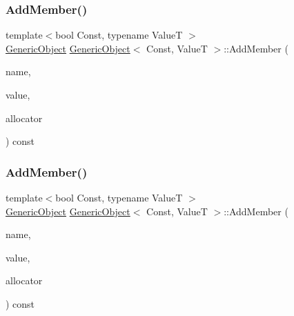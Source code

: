 \mbox{\label{classGenericObject_a011a0dd06baf841e3f6e21a3c95db3c1}} 
\subsubsection{\texorpdfstring{Add\+Member()}{AddMember()}\hspace{0.1cm}{\footnotesize\ttfamily [3/4]}}
{\footnotesize\ttfamily template$<$bool Const, typename ValueT $>$ \\
\hyperlink{classGenericObject}{Generic\+Object} \hyperlink{classGenericObject}{Generic\+Object}$<$ Const, ValueT $>$\+::Add\+Member (\begin{DoxyParamCaption}\item[{\hyperlink{classGenericObject_a9b8381fc96f5f89b2163b052ed66cc59}{String\+Ref\+Type}}]{name,  }\item[{\hyperlink{classGenericObject_a930aa30f89caee7ba7bff60bf9dc21b1}{Value\+Type} \&}]{value,  }\item[{\hyperlink{classGenericObject_a00c8cee952d5ebadc5e1c309aa489ad9}{Allocator\+Type} \&}]{allocator }\end{DoxyParamCaption}) const\hspace{0.3cm}{\ttfamily [inline]}}

\mbox{\label{classGenericObject_a3af43681aea03c4313d689bcbf5e3363}} 
\subsubsection{\texorpdfstring{Add\+Member()}{AddMember()}\hspace{0.1cm}{\footnotesize\ttfamily [4/4]}}
{\footnotesize\ttfamily template$<$bool Const, typename ValueT $>$ \\
\hyperlink{classGenericObject}{Generic\+Object} \hyperlink{classGenericObject}{Generic\+Object}$<$ Const, ValueT $>$\+::Add\+Member (\begin{DoxyParamCaption}\item[{\hyperlink{classGenericObject_a9b8381fc96f5f89b2163b052ed66cc59}{String\+Ref\+Type}}]{name,  }\item[{\hyperlink{classGenericObject_a9b8381fc96f5f89b2163b052ed66cc59}{String\+Ref\+Type}}]{value,  }\item[{\hyperlink{classGenericObject_a00c8cee952d5ebadc5e1c309aa489ad9}{Allocator\+Type} \&}]{allocator }\end{DoxyParamCaption}) const\hspace{0.3cm}{\ttfamily [inline]}}

